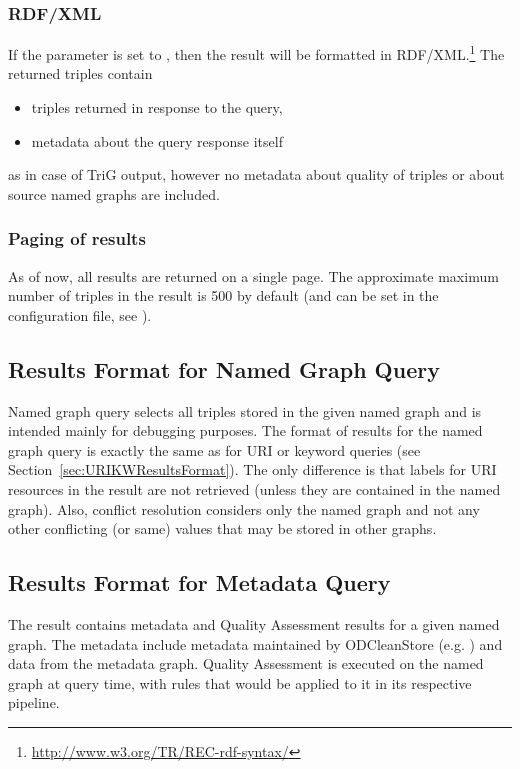 {\subsubsection{RDF/XML}
\label{sec:URIKWRDFXML}

If the  parameter is set to , then the result will be formatted in RDF/XML.\footnote{\url{http://www.w3.org/TR/REC-rdf-syntax/}} The returned triples contain

\begin{itemize}
  \item triples returned in response to the query,
  \item  metadata about the query response itself
\end{itemize}

as in case of TriG output, however no metadata about quality of triples or about source named graphs are included.

\subsubsection{Paging of results}
\label{sec:URIKWPaging}
As of now, all results are returned on a single page. The approximate maximum number of triples in the result is 500 by default (and can be set in the configuration file, see ).

\subsection{Results Format for Named Graph Query}
Named graph query selects all triples stored in the given named graph and is intended mainly for debugging purposes.
The format of results for the named graph query is exactly the same as for URI or keyword queries (see Section~\ref{sec:URIKWResultsFormat}). The only difference is that labels for URI resources in the result are not retrieved (unless they are contained in the named graph). Also, conflict resolution considers only the named graph and not any other conflicting (or same) values that may be stored in other graphs.

\subsection{Results Format for Metadata Query}
The result contains metadata and Quality Assessment results for a given named graph. The metadata include metadata maintained by ODCleanStore (e.g. ) and data from the  metadata graph. Quality Assessment is executed on the named graph at query time, with rules that would be applied to it in its respective pipeline.

}
